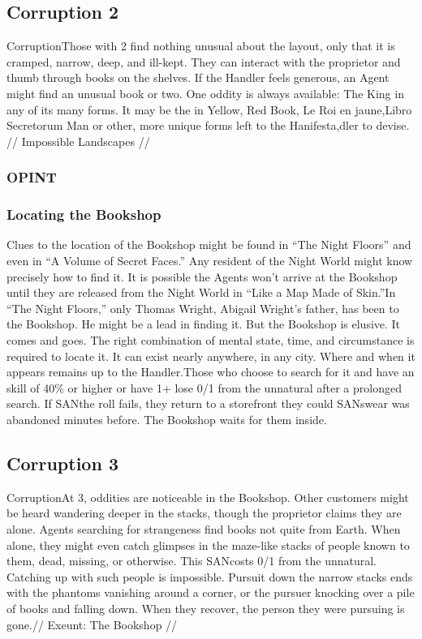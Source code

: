 \documentclass{report}
\begin{document}
\begin{multicols}{2}
\subsection{Corruption 2}
CorruptionThose with  2 find nothing unusual about the layout, only that it is cramped, narrow, deep, and ill-kept. They can interact with the proprietor and thumb through books on the shelves. If the Handler feels generous, an Agent might find an unusual book or two. One oddity is always available: The King  in any of its many forms. It may be the in Yellow, Red Book, Le Roi en jaune,Libro Secretorum Man or other, more unique forms left to the Hanifesta,dler to devise.\newpage
// Impossible Landscapes //
\subsubsection{OPINT}

\subsubsection{Locating the Bookshop}
Clues to the location of the Bookshop might be found in “The Night Floors” and even in “A Volume of Secret Faces.” Any resident of the Night World might know precisely how to find it. It is possible the Agents won't arrive at the Bookshop until they are released from the Night World in “Like a Map Made of Skin.”In “The Night Floors,” only Thomas Wright, Abigail Wright's father, has been to the Bookshop. He might be a lead in finding it. But the Bookshop is elusive. It comes and goes. The right combination of mental state, time, and circumstance is required to locate it. It can exist nearly anywhere, in any city. Where and when it appears remains up to the Handler.Those who choose to search for it and have an  skill of 40\% or higher or have  1+ lose 0/1  from the unnatural after a prolonged search. If SANthe  roll fails, they return to a storefront they could SANswear was abandoned minutes before. The Bookshop waits for them inside.
\subsection{Corruption 3}
CorruptionAt  3, oddities are noticeable in the Bookshop. Other customers might be heard wandering deeper in the stacks, though the proprietor claims they are alone. Agents searching for strangeness find books not quite from Earth. When alone, they might even catch glimpses in the maze-like stacks of people known to them, dead, missing, or otherwise. This SANcosts 0/1  from the unnatural. Catching up with such people is impossible. Pursuit down the narrow stacks ends with the phantoms vanishing around a corner, or the pursuer knocking over a pile of books and falling down. When they recover, the person they were pursuing is gone.// Exeunt: The Bookshop //

\end{multicols}
\end{document}
